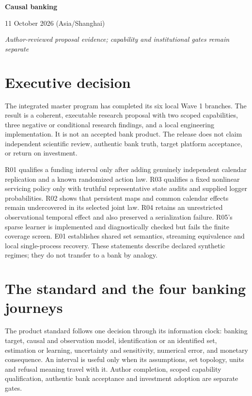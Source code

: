 \documentclass[11pt,a4paper]{article}
\begin{document}
\begin{center}
{\LARGE\bfseries Causal banking\par}
\vspace{2mm}{\Large Integrated execution release\par}
\vspace{2mm}11 October 2026 (Asia/Shanghai)\par
\vspace{2mm}\textit{Author-reviewed proposal evidence; capability and institutional gates remain separate}
\end{center}

\section*{Executive decision}

The integrated master program has completed its six local Wave 1 branches.
The result is a coherent, executable research proposal with two scoped
capabilities, three negative or conditional research findings, and a local
engineering implementation. It is not an accepted bank product. The release
does not claim independent scientific review, authentic bank truth, target
platform acceptance, or return on investment.

R01 qualifies a funding interval only after adding genuinely independent
calendar replication and a known randomized action law. R03 qualifies a fixed
nonlinear servicing policy only with truthful representative state audits and
supplied logger probabilities. R02 shows that persistent maps and common
calendar effects remain undercovered in its selected joint law. R04 retains an
unrestricted observational temporal effect and also preserved a serialization
failure. R05's sparse learner is implemented and diagnostically checked but
fails the finite coverage screen. E01 establishes shared set semantics,
streaming equivalence and local single-process recovery. These statements
describe declared synthetic regimes; they do not transfer to a bank by
analogy.

\section{The standard and the four banking journeys}

The product standard follows one decision through its information clock:
banking target, causal and observation model, identification or an identified
set, estimation or learning, uncertainty and sensitivity, numerical error,
and monetary consequence. An interval is useful only when its assumptions,
set topology, units and refusal meaning travel with it. Author completion,
scoped capability qualification, authentic bank acceptance and investment
adoption are separate gates.
\end{document}
